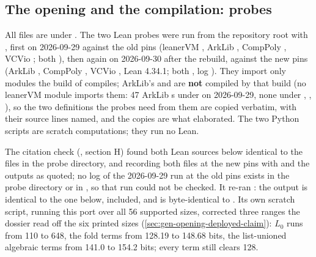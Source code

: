 \subsection{The opening and the compilation: probes}\label{sec:gen-opening-probes}

\begin{sloppypar}
All files are under . The two Lean
probes were run from the repository root with
, first on
2026-09-29 against the old pins (leanerVM , ArkLib , CompPoly
, VCVio ; both ), then again on 2026-09-30 after the
rebuild, against the new pins (ArkLib , CompPoly , VCVio
, Lean 4.34.1; both , log ). They import only
modules the build of  compiles; ArkLib's  and
 are \textbf{not} compiled by that build (no leanerVM module imports
them: 47 ArkLib s under  on 2026-09-29, none
under , , ), so the two definitions the
probes need from them are copied verbatim, with their source lines named, and the copies are what
elaborated. The two Python scripts are scratch computations; they run no Lean.

The citation check (, section H) found both Lean sources below
identical to the files in the probe directory, and  recording both files at
the new pins with  and the outputs as quoted; no log of the 2026-09-29 run at the old
pins exists in the probe directory or in , so that run could not be checked. It re-ran
: the output is identical to the one below,  included, and
 is byte-identical to .
Its own scratch script, running this port over all 56 supported sizes, corrected three ranges the
dossier read off the six printed sizes (\cref{sec:gen-opening-deployed-claim}): $L_0$ runs from 110 to
648, the fold terms from 128.19 to 148.68 bits, the list-unioned algebraic terms from 141.0 to 154.2
bits; every term still clears 128.
\end{sloppypar}

